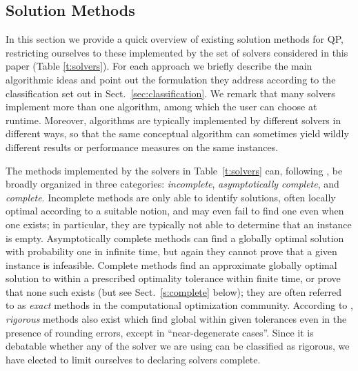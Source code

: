 
\subsection{Solution Methods}\label{sec:algo}

In this section we provide a quick overview of existing solution methods for QP, restricting ourselves to these implemented by the set of solvers considered in this paper (Table \ref{t:solvers}). For each approach we briefly describe the main algorithmic ideas and point out the formulation they address according to the classification set out in Sect.~\ref{sec:classification}. We remark that many solvers implement more than one algorithm, among which the user can choose at runtime. Moreover, algorithms are typically implemented by different solvers in different ways, so that the same conceptual algorithm can sometimes yield wildly different results or performance measures on the same instances.


The methods implemented by the solvers in Table~\ref{t:solvers} can, following \cite{neumaier}, be broadly organized in three categories: {\it incomplete}, {\it asymptotically complete}, and {\it complete}. Incomplete methods are only able to identify solutions, often locally optimal according to a suitable notion, and may even fail to find one even when one exists; in particular, they are typically not able to determine that an instance is empty. Asymptotically complete methods can find a globally optimal solution with probability one in infinite time, but again they cannot prove that a given instance is infeasible. Complete methods find an approximate globally optimal solution to within a prescribed optimality tolerance within finite time, or prove that none such exists (but see Sect.~\ref{s:complete} below); they are often referred to as \emph{exact} methods in the computational optimization community. According to \cite{neumaier}, {\it rigorous} methods also exist which find global within given tolerances even in the presence of rounding errors, except in ``near-degenerate cases''. Since it is debatable whether any of the solver we are using can be classified as rigorous, we have elected to limit ourselves to declaring solvers complete.

